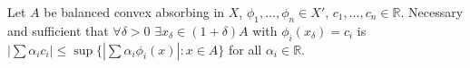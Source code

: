 Let $A$ be balanced convex absorbing in $X$, $\phi_1,\ldots,\phi_n\in X'$, $c_1,\ldots,c_n\in\mathbb{R}$. Necessary and sufficient that $\forall\delta>0$ $\exists x_\delta\in(1+\delta)A$ with $\phi_i(x_\delta)=c_i$ is $|\sum\alpha_i c_i|\leqslant\sup\{|\sum\alpha_i\phi_i(x)|:x\in A\}$ for all $\alpha_i\in\mathbb{R}$.
